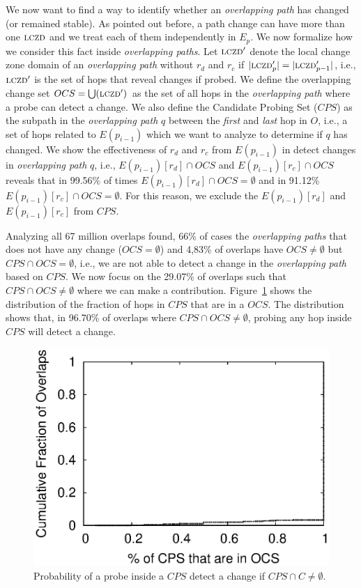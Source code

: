 We now want to find a way to identify whether an \emph{overlapping path}
has changed (or remained stable). As pointed out before, a path change can have more
than one $\mathrm{\textsc{lczd}}$ and we treat each of them independently in $E_p$.
We now formalize how we consider this fact inside \emph{overlapping paths}.
Let $\mathrm{\textsc{lczd}}'$ denote the local change zone domain of an \emph{overlapping path}
without $r_d$ and $r_c$ if $|\mathrm{\textsc{lczd}}'_{p}| = |\mathrm{\textsc{lczd}}'_{p-1}|$, i.e.,
$\mathrm{\textsc{lczd}}'$ is the set of hops that reveal changes if probed. We define the
overlapping change set $OCS = \bigcup(\mathrm{\textsc{lczd}}')$ as the set of all hops in the
\emph{overlapping path} where a probe can detect a change.
We also define the Candidate Probing Set ($CPS$) as the subpath 
in the \emph{overlapping path} $q$ between the \emph{first} and \emph{last} 
hop in $O$, i.e., a set of hops related to $E(p_{i-1})$ which we want to analyze
to determine if $q$ has changed. We show the effectiveness of $r_d$ and $r_c$ 
from $E(p_{i-1})$ in detect changes in \emph{overlapping path} $q$, i.e.,
$E(p_{i-1})[r_d] \cap OCS$ and $E(p_{i-1})[r_c] \cap OCS$ reveals that in 99.56\% of times 
$E(p_{i-1})[r_d] \cap OCS = \emptyset$ and in 91.12\% $E(p_{i-1})[r_c] \cap OCS = \emptyset$.
For this reason, we exclude the $E(p_{i-1})[r_d]$ and $E(p_{i-1})[r_c]$ from
$CPS$.

Analyzing all 67 million overlaps found, 66\% of cases the \emph{overlapping paths}
that does not have any change ($OCS = \emptyset$) and 4,83\% of overlaps have 
$OCS \ne \emptyset$ but $CPS \cap OCS = \emptyset$, 
i.e., we are not able to detect a change in the \emph{overlapping path}
based on $CPS$. 
We now focus on the 29.07\% of overlaps such that $CPS \cap OCS \ne \emptyset$
where we can make a contribution. Figure~\ref{fig:lczd.intersection}  
shows the distribution of the fraction of hops in $CPS$ that are in a $OCS$.  The distribution shows that,
in 96.70\% of overlaps where $CPS \cap OCS \ne \emptyset$, probing any hop inside $CPS$ 
will detect a change.



\begin{figure}
\begin{center}
\includegraphics[width=0.8\columnwidth]{figs/patching/overlapcoverage/overlapcoverage_only_lczd.eps}
\caption{Probability of a probe inside a $CPS$ detect a change if $CPS \cap C \ne \emptyset$.}
\label{fig:lczd.intersection}
\end{center}
%
\end{figure}
